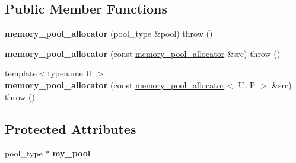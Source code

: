 \subsection*{Public Member Functions}
\begin{DoxyCompactItemize}
\item 
\hypertarget{classtbb_1_1interface6_1_1memory__pool__allocator_3_01void_00_01P_01_4_a8e697e2d03e8f69de1728409bec4f7b5}{}{\bfseries memory\+\_\+pool\+\_\+allocator} (pool\+\_\+type \&pool)  throw ()\label{classtbb_1_1interface6_1_1memory__pool__allocator_3_01void_00_01P_01_4_a8e697e2d03e8f69de1728409bec4f7b5}

\item 
\hypertarget{classtbb_1_1interface6_1_1memory__pool__allocator_3_01void_00_01P_01_4_a001103c81ba25e645305f19a82db2e4a}{}{\bfseries memory\+\_\+pool\+\_\+allocator} (const \hyperlink{classtbb_1_1interface6_1_1memory__pool__allocator}{memory\+\_\+pool\+\_\+allocator} \&src)  throw ()\label{classtbb_1_1interface6_1_1memory__pool__allocator_3_01void_00_01P_01_4_a001103c81ba25e645305f19a82db2e4a}

\item 
\hypertarget{classtbb_1_1interface6_1_1memory__pool__allocator_3_01void_00_01P_01_4_a8d3db3082c1fa40ccb3997626f61e61e}{}{\footnotesize template$<$typename U $>$ }\\{\bfseries memory\+\_\+pool\+\_\+allocator} (const \hyperlink{classtbb_1_1interface6_1_1memory__pool__allocator}{memory\+\_\+pool\+\_\+allocator}$<$ U, P $>$ \&src)  throw ()\label{classtbb_1_1interface6_1_1memory__pool__allocator_3_01void_00_01P_01_4_a8d3db3082c1fa40ccb3997626f61e61e}

\end{DoxyCompactItemize}
\subsection*{Protected Attributes}
\begin{DoxyCompactItemize}
\item 
\hypertarget{classtbb_1_1interface6_1_1memory__pool__allocator_3_01void_00_01P_01_4_a1e497d3d88dcb063ab6594eb4ad3dc35}{}pool\+\_\+type $\ast$ {\bfseries my\+\_\+pool}\label{classtbb_1_1interface6_1_1memory__pool__allocator_3_01void_00_01P_01_4_a1e497d3d88dcb063ab6594eb4ad3dc35}

\end{DoxyCompactItemize}
